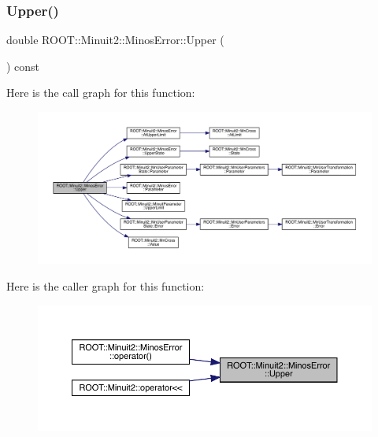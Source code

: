 \subsubsection{\texorpdfstring{Upper()}{Upper()}\hspace{0.1cm}{\footnotesize\ttfamily [2/2]}}
{\footnotesize\ttfamily double R\+O\+O\+T\+::\+Minuit2\+::\+Minos\+Error\+::\+Upper (\begin{DoxyParamCaption}{ }\end{DoxyParamCaption}) const\hspace{0.3cm}{\ttfamily [inline]}}

Here is the call graph for this function\+:
\nopagebreak
\begin{figure}[H]
\begin{center}
\leavevmode
\includegraphics[width=350pt]{d2/dd1/classROOT_1_1Minuit2_1_1MinosError_a0223fde13608aadee1f15b51d15b2bf6_cgraph}
\end{center}
\end{figure}
Here is the caller graph for this function\+:\nopagebreak
\begin{figure}[H]
\begin{center}
\leavevmode
\includegraphics[width=350pt]{d2/dd1/classROOT_1_1Minuit2_1_1MinosError_a0223fde13608aadee1f15b51d15b2bf6_icgraph}
\end{center}
\end{figure}
\mbox{\label{classROOT_1_1Minuit2_1_1MinosError_a5f37bb106903e148029b8461f9bbbe25}} 
